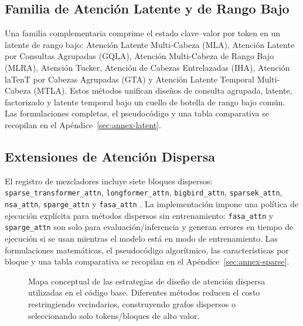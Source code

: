 \subsection{Familia de Atención Latente y de Rango Bajo}
Una familia complementaria comprime el estado clave--valor por token en un latente de rango bajo: Atención Latente Multi-Cabeza (MLA), Atención Latente por Consultas Agrupadas (GQLA), Atención Multi-Cabeza de Rango Bajo (MLRA), Atención Tucker, Atención de Cabezas Entrelazadas (IHA), Atención laTenT por Cabezas Agrupadas (GTA) y Atención Latente Temporal Multi-Cabeza (MTLA). Estos métodos unifican diseños de consulta agrupada, latente, factorizado y latente temporal bajo un cuello de botella de rango bajo común. Las formulaciones completas, el pseudocódigo y una tabla comparativa se recopilan en el Apéndice~\ref{sec:annex-latent}.

\subsection{Extensiones de Atención Dispersa}
El registro de mezcladores incluye siete bloques dispersos: \texttt{sparse\_transformer\_attn}, \texttt{longformer\_attn}, \texttt{bigbird\_attn}, \texttt{sparsek\_attn}, \texttt{nsa\_attn}, \texttt{sparge\_attn} y \texttt{fasa\_attn} \citep{child_sparse_transformer_2019,beltagy_longformer_2020,zaheer_bigbird_2020,lou_sparsek_2024,yuan_nsa_2025,zhang_spargeattn_2025,wang_fasa_2026}. La implementación impone una política de ejecución explícita para métodos dispersos sin entrenamiento: \texttt{fasa\_attn} y \texttt{sparge\_attn} son solo para evaluación/inferencia y generan errores en tiempo de ejecución si se usan mientras el modelo está en modo de entrenamiento. Las formulaciones matemáticas, el pseudocódigo algorítmico, las características por bloque y una tabla comparativa se recopilan en el Apéndice~\ref{sec:annex-sparse}.

\begin{figure}[t]
\centering
{}
\caption{Mapa conceptual de las estrategias de diseño de atención dispersa utilizadas en el código base. Diferentes métodos reducen el costo restringiendo vecindarios, construyendo grafos dispersos o seleccionando solo tokens/bloques de alto valor.}
\label{fig:sparse-map}
\end{figure}


